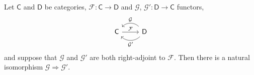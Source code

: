 \documentclass[notes.tex]{subfiles}
\begin{document}
\begin{lemma}
  Let $\mathsf{C}$ and $\mathsf{D}$ be categories, $\mathcal{F}\colon \mathsf{C} \rightarrow \mathsf{D}$ and $\mathcal{G}$, $\mathcal{G}'\colon \mathsf{D} \rightarrow \mathsf{C}$ functors,
  \begin{equation*}
    \begin{tikzcd}
      \mathsf{C}
      \arrow[r, rightarrow, "\mathcal{F}"]
      & \mathsf{D}
      \arrow[l, rightarrow, bend right=45, swap, "\mathcal{G}"]
      \arrow[l, rightarrow, bend left=45, "\mathcal{G}'"]
    \end{tikzcd}
  \end{equation*}
  and suppose that $\mathcal{G}$ and $\mathcal{G}'$ are both right-adjoint to $\mathcal{F}$. Then there is a natural isomorphism $\mathcal{G} \Rightarrow \mathcal{G}'$.
\end{lemma}
\end{document}
